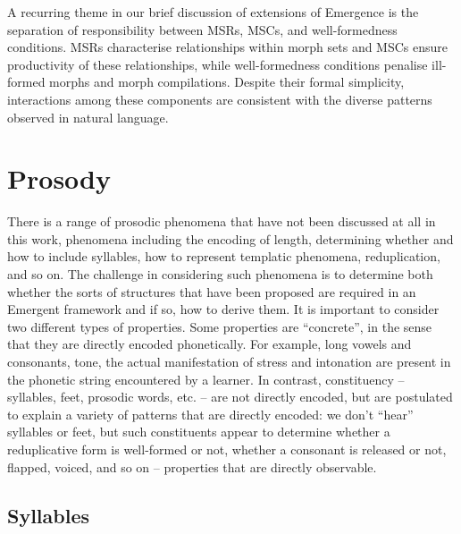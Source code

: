 A recurring theme in our brief discussion of extensions of Emergence is the separation of responsibility between MSRs, MSCs, and well-formedness conditions. MSRs characterise relationships within morph sets and MSCs ensure productivity of these relationships, while well-formedness conditions penalise ill-formed morphs and morph compilations. Despite their formal simplicity, interactions among these components are consistent with the diverse patterns observed in natural language.



\section{Prosody}

There is a range of prosodic phenomena that have not been discussed at all in this work, phenomena including the encoding of length, determining whether and how to include syllables, how to represent templatic phenomena, reduplication, and so on. The challenge in considering such phenomena is to determine both whether the sorts of structures that have been proposed are required in an Emergent framework and if so, how to derive them. It is important to consider two different types of properties. Some properties are ``concrete'', in the sense that they are directly encoded phonetically. For example, long vowels and consonants, tone, the actual manifestation of stress and intonation are present in the phonetic string encountered by a learner. In contrast, constituency -- syllables, feet, prosodic words, etc. -- are not directly encoded, but are postulated to explain a variety of patterns that are directly encoded: we don't ``hear'' syllables or feet, but such constituents appear to determine whether a reduplicative form is well-formed or not, whether a consonant is released or not, flapped, voiced, and so on -- properties that are directly observable.

\subsection{Syllables}

